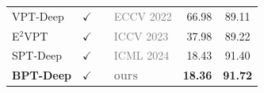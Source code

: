 \begin{table}[t]
{\begin{tabular}{l cclrc}
        \rowcolor{col3} VPT-Deep~\cite{jia2022visual}            & $\checkmark$ & & \textcolor{gray}{ECCV 2022}     & 66.98 & 89.11\\
        \rowcolor{col3} E$^2$VPT~\cite{cheng2023e2vpt}           & $\checkmark$ & & \textcolor{gray}{ICCV 2023}     & 37.98 & 89.22\\
        \rowcolor{col3} SPT-Deep~\cite{wang2024revisiting}       & $\checkmark$ & & \textcolor{gray}{ICML 2024}     & 18.43 & 91.40\\
        \rowcolor{col3} {\bf BPT-Deep}                    & $\checkmark$ & & \textcolor{gray}{\bf ours}    & \textbf{18.36} & \textbf{91.72}\\
    \bottomrule
    \end{tabular}
}
\vspace{-3mm}
\label{tab:sota_sup}
\end{table}

